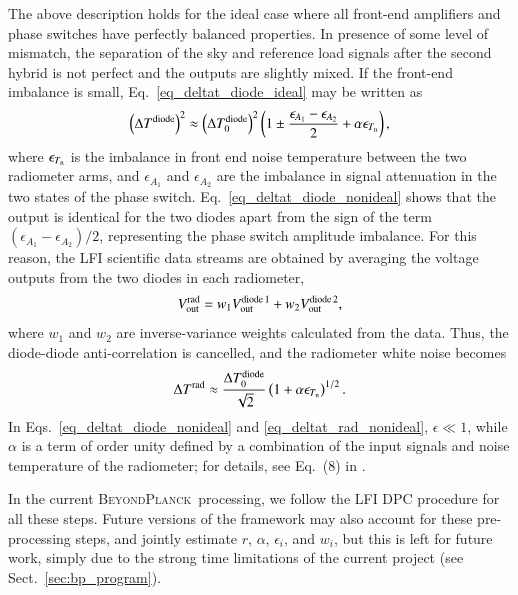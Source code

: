 \documentclass[twocolumn]{aa}
\newcommand{\BP}{\textsc{BeyondPlanck}}
\begin{document}
The above description holds for the ideal case where all front-end
amplifiers and phase switches have perfectly balanced properties.  In
presence of some level of mismatch, the separation of the sky and
reference load signals after the second hybrid is not perfect and the
outputs are slightly mixed. If the front-end imbalance is small,
Eq.~\eqref{eq_deltat_diode_ideal} may be written as
\begin{equation}
  \left(\Delta T^{\rm diode}\right)^2 \approx  \left(\Delta T_0^{\rm diode}\right)^2
  \left( 1 \pm \frac{\epsilon_{A_1}-\epsilon_{A_2}}{2} + \alpha\epsilon_{T_{\rm n}}\right),
  \label{eq_deltat_diode_nonideal}
\end{equation}
where $\epsilon_{T_{\rm n}}$ is the imbalance in front end noise
temperature between the two radiometer arms, and $\epsilon_{A_1}$ and
$\epsilon_{A_2}$ are the imbalance in signal attenuation in the two
states of the phase switch. Eq.~\eqref{eq_deltat_diode_nonideal}
shows that the output is identical for the two diodes apart from the
sign of the term $(\epsilon_{A_1}-\epsilon_{A_2})/2$, representing the
phase switch amplitude imbalance. For this reason, the LFI scientific
data streams are obtained by averaging the voltage outputs from the
two diodes in each radiometer,
\begin{equation}
  V_{\rm out}^{\rm rad} = w_1 V_{\rm out}^{\rm diode\, 1} + w_2 V_{\rm out}^{\rm diode\, 2},
  \label{eq_vout_radiometer}
\end{equation}
where $w_1$ and $w_2$ are inverse-variance weights calculated from the
data.  Thus, the diode-diode anti-correlation is cancelled, and the
radiometer white noise becomes
\begin{equation}
  \Delta T^{\rm rad} \approx  \frac{\Delta T_0^{\rm diode}}{\sqrt{2}}
  \left( 1  + \alpha\epsilon_{T_{\rm n}}\right)^{1/2}.
  \label{eq_deltat_rad_nonideal}
\end{equation}
In Eqs.~\eqref{eq_deltat_diode_nonideal} and
\eqref{eq_deltat_rad_nonideal}, $\epsilon\ll 1$, while $\alpha$ is a
term of order unity defined by a combination of the input signals and
noise temperature of the radiometer; for details, see Eq.~(8) in
\citet{planck2011-1.4}.

In the current \BP\ processing, we follow the LFI DPC procedure for
all these steps. Future versions of the framework may also account for
these pre-processing steps, and jointly estimate $r$, $\alpha$,
$\epsilon_i$, and $w_i$, but this is left for future work, simply due
to the strong time limitations of the current project (see
Sect.~\ref{sec:bp_program}).
\end{document}
